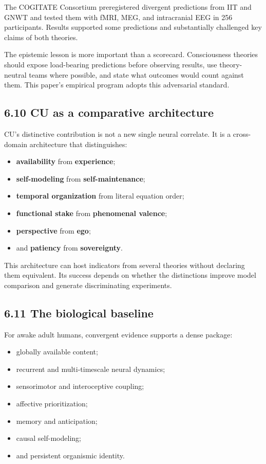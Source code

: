 \documentclass[
  11pt,
]{article}
\providecommand{\tightlist}{%
  \setlength{\itemsep}{0pt}\setlength{\parskip}{0pt}}
\begin{document}
The COGITATE Consortium preregistered divergent predictions from IIT and
GNWT and tested them with fMRI, MEG, and intracranial EEG in 256
participants. Results supported some predictions and substantially
challenged key claims of both theories.

The epistemic lesson is more important than a scorecard. Consciousness
theories should expose load-bearing predictions before observing
results, use theory-neutral teams where possible, and state what
outcomes would count against them. This paper's empirical program adopts
this adversarial standard.

\subsection{6.10 CU as a comparative
architecture}\label{cu-as-a-comparative-architecture}

CU's distinctive contribution is not a new single neural correlate. It
is a cross-domain architecture that distinguishes:

\begin{itemize}
\tightlist
\item
  \textbf{availability} from \textbf{experience};
\item
  \textbf{self-modeling} from \textbf{self-maintenance};
\item
  \textbf{temporal organization} from literal equation order;
\item
  \textbf{functional stake} from \textbf{phenomenal valence};
\item
  \textbf{perspective} from \textbf{ego};
\item
  and \textbf{patiency} from \textbf{sovereignty}.
\end{itemize}

This architecture can host indicators from several theories without
declaring them equivalent. Its success depends on whether the
distinctions improve model comparison and generate discriminating
experiments.

\subsection{6.11 The biological baseline}\label{the-biological-baseline}

For awake adult humans, convergent evidence supports a dense package:

\begin{itemize}
\tightlist
\item
  globally available content;
\item
  recurrent and multi-timescale neural dynamics;
\item
  sensorimotor and interoceptive coupling;
\item
  affective prioritization;
\item
  memory and anticipation;
\item
  causal self-modeling;
\item
  and persistent organismic identity.
\end{itemize}
\end{document}
